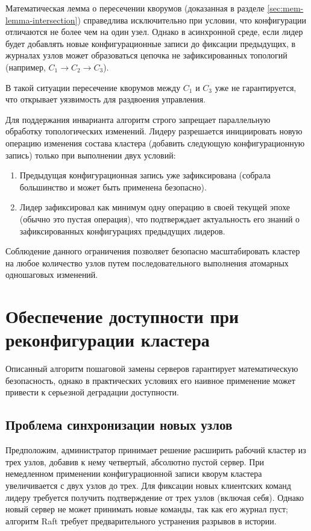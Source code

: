 Математическая лемма о пересечении кворумов (доказанная в разделе \ref{sec:mem-lemma-intersection}) справедлива исключительно при условии, что конфигурации отличаются не более чем на один узел. Однако в асинхронной среде, если лидер будет добавлять новые конфигурационные записи до фиксации предыдущих, в журналах узлов может образоваться цепочка не зафиксированных топологий (например, $C_1 \rightarrow C_2 \rightarrow C_3$). 

В такой ситуации пересечение кворумов между $C_1$ и $C_3$ уже не гарантируется, что открывает уязвимость для раздвоения управления.

Для поддержания инварианта алгоритм строго запрещает параллельную обработку топологических изменений. Лидеру разрешается инициировать новую операцию изменения состава кластера (добавить следующую конфигурационную запись) только при выполнении двух условий:
\begin{enumerate}
    \item Предыдущая конфигурационная запись уже зафиксирована (собрала большинство и может быть применена безопасно).
    \item Лидер зафиксировал как минимум одну операцию в своей текущей эпохе (обычно это пустая операция), что подтверждает актуальность его знаний о зафиксированных конфигурациях предыдущих лидеров.
\end{enumerate}

Соблюдение данного ограничения позволяет безопасно масштабировать кластер на любое количество узлов путем последовательного выполнения атомарных одношаговых изменений.

\section{Обеспечение доступности при реконфигурации кластера}
\label{sec:mem-availability}

Описанный алгоритм пошаговой замены серверов гарантирует математическую безопасность, однако в практических условиях его наивное применение может привести к серьезной деградации доступности.

\subsection{Проблема синхронизации новых узлов}

Предположим, администратор принимает решение расширить рабочий кластер из трех узлов, добавив к нему четвертый, абсолютно пустой сервер. При немедленном применении конфигурационной записи кворум кластера увеличивается с двух узлов до трех.
Для фиксации новых клиентских команд лидеру требуется получить подтверждение от трех узлов (включая себя). Однако новый сервер не может принимать новые команды, так как его журнал пуст; алгоритм Raft требует предварительного устранения разрывов в истории.

